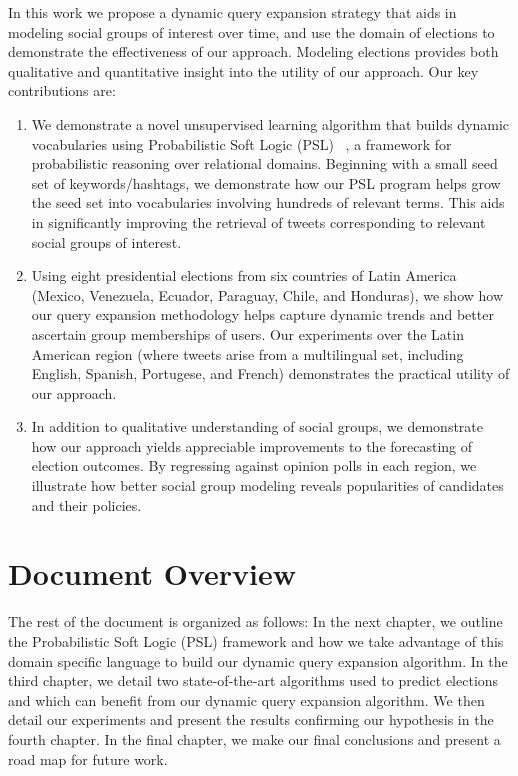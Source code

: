 In this work we propose a dynamic query expansion strategy that aids in modeling social groups of interest over time, and
use the domain of elections to demonstrate the effectiveness of our approach. Modeling elections provides both
qualitative and quantitative insight into the utility of our approach.
Our key contributions are:
\begin{enumerate}
\item We demonstrate
a novel unsupervised learning algorithm that builds dynamic vocabularies using Probabilistic Soft Logic (PSL) ~\cite{kimmig2012short}, a framework for probabilistic reasoning over relational domains.
Beginning with a small seed set of keywords/hashtags, we demonstrate how our PSL program helps
grow the seed set into 
vocabularies involving hundreds of relevant terms. This aids in significantly improving the retrieval of tweets
corresponding to relevant
social groups of interest.
\item Using eight presidential elections from six countries of Latin America (Mexico, Venezuela, Ecuador, Paraguay, Chile, and Honduras), we show how our query expansion methodology helps capture dynamic trends and
better ascertain group memberships of users. Our %
experiments over the Latin American region (where tweets
arise from a multilingual set, including English, Spanish, Portugese, and French) demonstrates the practical utility
of our approach.
\item In addition to qualitative understanding of social groups, we demonstrate how our approach yields
appreciable improvements to the forecasting of election outcomes. By regressing against opinion polls in each region,
we illustrate how better social group modeling reveals popularities of candidates and their policies.
\end{enumerate}
\section{Document Overview}
The rest of the document is organized as follows:
In the next chapter, we outline the Probabilistic Soft Logic (PSL) framework and how we take advantage 
of this domain specific language to build our dynamic query expansion algorithm.
In the third chapter, we detail two state-of-the-art algorithms used to predict elections and which can
benefit from our dynamic query expansion algorithm.
We then detail our experiments and present the results confirming our hypothesis in the fourth chapter.
In the final chapter, we make our final conclusions and present a road map for future work.
